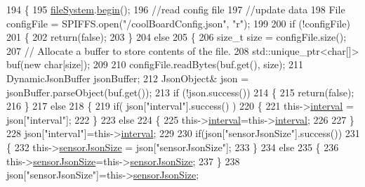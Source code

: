 \begin{DoxyCode}
194 \{
195     \hyperlink{classCoolBoard_a42c2586fbb13ff7f06538e9284e8538d}{fileSystem}.\hyperlink{classCoolFileSystem_a6ba6f666ed4c530174f8569d2c636748}{begin}(); 
196     \textcolor{comment}{//read config file}
197     \textcolor{comment}{//update data}
198     File configFile = SPIFFS.open(\textcolor{stringliteral}{"/coolBoardConfig.json"}, \textcolor{stringliteral}{"r"});
199 
200     \textcolor{keywordflow}{if} (!configFile) 
201     \{
202         \textcolor{keywordflow}{return}(\textcolor{keyword}{false});
203     \}
204     \textcolor{keywordflow}{else}
205     \{
206         \textcolor{keywordtype}{size\_t} size = configFile.size();
207         \textcolor{comment}{// Allocate a buffer to store contents of the file.}
208         std::unique\_ptr<char[]> buf(\textcolor{keyword}{new} \textcolor{keywordtype}{char}[size]);
209 
210         configFile.readBytes(buf.get(), size);
211         DynamicJsonBuffer jsonBuffer;
212         JsonObject& json = jsonBuffer.parseObject(buf.get());
213         \textcolor{keywordflow}{if} (!json.success()) 
214         \{
215               \textcolor{keywordflow}{return}(\textcolor{keyword}{false});
216         \} 
217         \textcolor{keywordflow}{else}
218         \{     
219             \textcolor{keywordflow}{if}( json[\textcolor{stringliteral}{"interval"}].success() )
220             \{
221                 this->\hyperlink{classCoolBoard_a6d5c2603e162dcd6e7626a5b90f30837}{interval} = json[\textcolor{stringliteral}{"interval"}]; 
222             \}
223             \textcolor{keywordflow}{else}
224             \{
225                 this->\hyperlink{classCoolBoard_a6d5c2603e162dcd6e7626a5b90f30837}{interval}=this->\hyperlink{classCoolBoard_a6d5c2603e162dcd6e7626a5b90f30837}{interval};
226                 
227             \}
228             json[\textcolor{stringliteral}{"interval"}]=this->\hyperlink{classCoolBoard_a6d5c2603e162dcd6e7626a5b90f30837}{interval};
229 
230             \textcolor{keywordflow}{if}(json[\textcolor{stringliteral}{"sensorJsonSize"}].success())
231             \{
232                 this->\hyperlink{classCoolBoard_a58e4b6072e3ac8b141ec0befb479208e}{sensorJsonSize} = json[\textcolor{stringliteral}{"sensorJsonSize"}];
233             \}
234             \textcolor{keywordflow}{else}
235             \{
236                 this->\hyperlink{classCoolBoard_a58e4b6072e3ac8b141ec0befb479208e}{sensorJsonSize}=this->\hyperlink{classCoolBoard_a58e4b6072e3ac8b141ec0befb479208e}{sensorJsonSize};
237             \}
238             json[\textcolor{stringliteral}{"sensorJsonSize"}]=this->\hyperlink{classCoolBoard_a58e4b6072e3ac8b141ec0befb479208e}{sensorJsonSize};

\end{DoxyCode}
